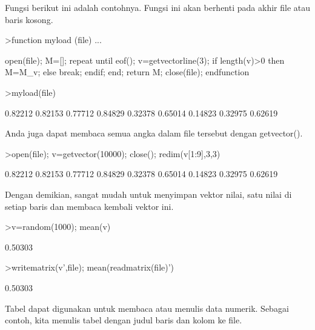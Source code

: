 \documentclass[12pt,arial,letterpaper]{book}
\begin{document}
\begin{eulernootebook}
\begin{eulercomment}
\begin{eulercomment}
\begin{eulernootebook}
\begin{eulercomment}
\begin{eulercomment}
\begin{eulercomment}
\begin{eulercomment}
\begin{eulercomment}
\begin{eulercomment}
\begin{eulercomment}
\begin{eulercomment}
\begin{eulercomment}
\begin{eulercomment}
\begin{eulercomment}
\begin{eulercomment}
\begin{eulercomment}
\begin{eulercomment}
Fungsi berikut ini adalah contohnya. Fungsi ini akan berhenti pada
akhir file atau baris kosong.
\end{eulercomment}
\begin{eulerprompt}
>function myload (file) ...
\end{eulerprompt}
\begin{eulerudf}
  open(file);
  M=[];
  repeat
     until eof();
     v=getvectorline(3);
     if length(v)>0 then M=M_v; else break; endif;
  end;
  return M;
  close(file);
  endfunction
\end{eulerudf}
\begin{eulerprompt}
>myload(file)
\end{eulerprompt}
\begin{euleroutput}
    0.82212   0.82153   0.77712 
    0.84829   0.32378   0.65014 
    0.14823   0.32975   0.62619 
\end{euleroutput}
\begin{eulercomment}
Anda juga dapat membaca semua angka dalam file tersebut dengan
getvector().
\end{eulercomment}
\begin{eulerprompt}
>open(file); v=getvector(10000); close(); redim(v[1:9],3,3)
\end{eulerprompt}
\begin{euleroutput}
    0.82212   0.82153   0.77712 
    0.84829   0.32378   0.65014 
    0.14823   0.32975   0.62619 
\end{euleroutput}
\begin{eulercomment}
Dengan demikian, sangat mudah untuk menyimpan vektor nilai, satu nilai
di setiap baris dan membaca kembali vektor ini.
\end{eulercomment}
\begin{eulerprompt}
>v=random(1000); mean(v)
\end{eulerprompt}
\begin{euleroutput}
  0.50303
\end{euleroutput}
\begin{eulerprompt}
>writematrix(v',file); mean(readmatrix(file)')
\end{eulerprompt}
\begin{euleroutput}
  0.50303
\end{euleroutput}
\begin{eulercomment}
Tabel dapat digunakan untuk membaca atau menulis data numerik. Sebagai
contoh, kita menulis tabel dengan judul baris dan kolom ke file.
\end{eulercomment}

\end{eulercomment}
\end{eulercomment}
\end{eulercomment}
\end{eulercomment}
\end{eulercomment}
\end{eulercomment}
\end{eulercomment}
\end{eulercomment}
\end{eulercomment}
\end{eulercomment}
\end{eulercomment}
\end{eulercomment}
\end{eulercomment}
\end{eulernootebook}
\end{eulercomment}
\end{eulercomment}
\end{eulernootebook}
\end{document}
